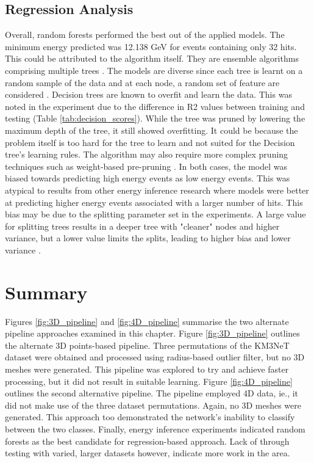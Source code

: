 \subsection{Regression Analysis}
Overall, random forests performed the best out of the applied models. The minimum energy predicted was 12.138 GeV for events containing only 32 hits. This could be attributed to the algorithm itself. They are ensemble algorithms comprising multiple trees \cite{scikit-learn}. The models are diverse since each tree is learnt on a random sample of the data and at each node, a random set of feature are considered \cite{scikit-learn}.  Decision trees are known to overfit and learn the data. This was noted in the experiment due to the difference in R2 values between training and testing (Table \ref{tab:decision_scores}). While the tree was pruned by lowering the maximum depth of the tree, it still showed overfitting. It could be because the problem itself is too hard for the tree to learn and not suited for the Decision tree's learning rules. The algorithm may also require more complex pruning techniques such as weight-based pre-pruning \cite{breiman1984classification, scikit-learn}. In both cases, the model was biased towards predicting high energy events as low energy events. This was atypical to results from other energy inference research \cite{km3net_2017, abbasi2011measurement, d2018flavor} where models were better at predicting higher energy events associated with a larger number of hits. This bias may be due to the splitting parameter set in the experiments. A large value for splitting trees results in a deeper tree with "cleaner" nodes and higher variance, but a lower value limits the splits, leading to higher bias and lower variance \cite{scikit-learn}. 

\section{Summary}
Figures \ref{fig:3D_pipeline} and \ref{fig:4D_pipeline} summarise the two alternate pipeline approaches examined in this chapter. Figure \ref{fig:3D_pipeline} outlines the alternate 3D points-based pipeline. Three permutations of the KM3NeT dataset were obtained and processed using radius-based outlier filter, but no 3D meshes were generated. This pipeline was explored to try and achieve faster processing, but it did not result in suitable learning. Figure \ref{fig:4D_pipeline} outlines the second alternative pipeline. The pipeline employed 4D data, ie., it did not make use of the three dataset permutations. Again, no 3D meshes were generated. This approach too demonstrated the network's inability to classify between the two classes. Finally, energy inference experiments indicated random forests as the best candidate for regression-based approach. Lack of through testing with varied, larger datasets however, indicate more work in the area.

